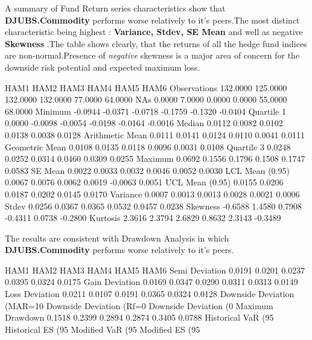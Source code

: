 \documentclass[12pt,letterpaper,english]{article}
\begin{document}
A summary of Fund Return series characteristics show that \textbf{DJUBS.Commodity} performs worse relatively to it's peers.The most distinct characteristic being highest : \textbf{Variance, Stdev, SE Mean} and well as negative \textbf{Skewness} .The table shows clearly, that the returns of all the hedge fund indices are non-normal.Presence of \emph{negative} skewness is a major area of concern for the downside risk potential and expected maximum loss.

\begin{Schunk}
\begin{Soutput}
                    HAM1     HAM2     HAM3     HAM4    HAM5    HAM6
Observations    132.0000 125.0000 132.0000 132.0000 77.0000 64.0000
NAs               0.0000   7.0000   0.0000   0.0000 55.0000 68.0000
Minimum          -0.0944  -0.0371  -0.0718  -0.1759 -0.1320 -0.0404
Quartile 1        0.0000  -0.0098  -0.0054  -0.0198 -0.0164 -0.0016
Median            0.0112   0.0082   0.0102   0.0138  0.0038  0.0128
Arithmetic Mean   0.0111   0.0141   0.0124   0.0110  0.0041  0.0111
Geometric Mean    0.0108   0.0135   0.0118   0.0096  0.0031  0.0108
Quartile 3        0.0248   0.0252   0.0314   0.0460  0.0309  0.0255
Maximum           0.0692   0.1556   0.1796   0.1508  0.1747  0.0583
SE Mean           0.0022   0.0033   0.0032   0.0046  0.0052  0.0030
LCL Mean (0.95)   0.0067   0.0076   0.0062   0.0019 -0.0063  0.0051
UCL Mean (0.95)   0.0155   0.0206   0.0187   0.0202  0.0145  0.0170
Variance          0.0007   0.0013   0.0013   0.0028  0.0021  0.0006
Stdev             0.0256   0.0367   0.0365   0.0532  0.0457  0.0238
Skewness         -0.6588   1.4580   0.7908  -0.4311  0.0738 -0.2800
Kurtosis          2.3616   2.3794   2.6829   0.8632  2.3143 -0.3489
\end{Soutput}
\end{Schunk}


The results are consistent with Drawdown Analysis in which \textbf{DJUBS.Commodity} performs worse relatively to it's peers.

\begin{Schunk}
\begin{Soutput}
                                HAM1    HAM2    HAM3    HAM4    HAM5    HAM6
Semi Deviation                0.0191  0.0201  0.0237  0.0395  0.0324  0.0175
Gain Deviation                0.0169  0.0347  0.0290  0.0311  0.0313  0.0149
Loss Deviation                0.0211  0.0107  0.0191  0.0365  0.0324  0.0128
Downside Deviation (MAR=10%
Downside Deviation (Rf=0%
Downside Deviation (0%
Maximum Drawdown              0.1518  0.2399  0.2894  0.2874  0.3405  0.0788
Historical VaR (95%
Historical ES (95%
Modified VaR (95%
Modified ES (95%
\end{Soutput}
\end{Schunk}
\end{document}
